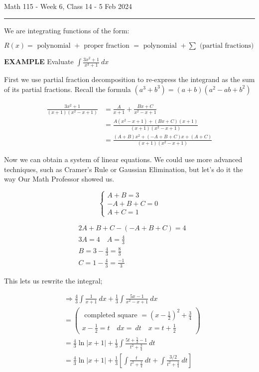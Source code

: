 \documentclass{article}
\begin{document}
Math 115 - Week 6, Class 14 - 5 Feb 2024
\hrule

\vspace{10pt}

We are integrating functions of the form:

$R(x)=\mbox{ polynomial }+\mbox{ proper fraction }=\mbox{ polynomial }+\sum\mbox{ (partial fractions) }$

\vspace{10pt}

{\bf{}EXAMPLE} Evaluate $\displaystyle\int\frac{3x^2+1}{x^3+1}\ dx$

\vspace{10pt}

First we use partial fraction decomposition to re-express the integrand as the sum of its partial fractions. Recall the formula $(a^3+b^3)=(a+b)(a^2-ab+b^2)$

\begin{align*}
\frac{3x^2+1}{(x+1)(x^2-x+1)}&=\frac{A}{x+1}+\frac{Bx+C}{x^2-x+1}\\
&=\frac{A(x^2-x+1)+(Bx+C)(x+1)}{(x+1)(x^2-x+1)}\\
&=\frac{(A+B)x^2+(-A+B+C)x+(A+C)}{(x+1)(x^2-x+1)}
\end{align*}

Now we can obtain a system of linear equations. We could use more advanced techniques, such as Cramer's Rule or Gaussian Elimination, but let's do it the way Our Math Professor showed us.

\[\left\{\begin{aligned}A+B=3\\-A+B+C=0\\A+C=1\end{aligned}\right.\]

\begin{align*}
&2A+B+C-(-A+B+C)=4\\
&3A=4\quad\boxed{A=\frac{4}{3}}\\
&B=3-\frac{4}{3}=\frac{8}{3}\\
&C=1-\frac{4}{3}=\frac{-1}{3}
\end{align*}

This lets us rewrite the integral;

\begin{align*}
&\Rightarrow\frac{4}{3}\int\frac{1}{x+1}\ dx+\frac{1}{3}\int\frac{5x-1}{x^2-x+1}\ dx\\
&=\left(\begin{aligned}\mbox{ completed square }=\left(x-\frac{1}{2}\right)^2+\frac{3}{4}\\x-\frac{1}{2}=t\quad dx=\ dt\quad x=t+\frac{1}{2}\end{aligned}\right)\\
&=\frac{4}{3}\ln|x+1|+\frac{1}{3}\int\frac{5t+\frac{5}{2}-1}{t^2+\frac{3}{4}}\ dt\\
&=\frac{4}{3}\ln|x+1|+\frac{1}{3}\left[\int\frac{t}{t^2+\frac{3}{4}}\ dt+\int\frac{3/2}{t^2+\frac{3}{4}}\ dt\right]
\end{align*}
\end{document}
